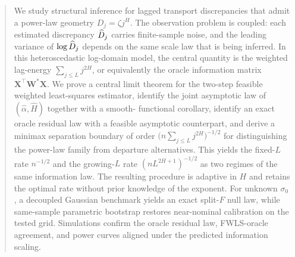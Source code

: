 \begin{abstract}
We study structural inference for lagged transport discrepancies that admit a
power-law geometry $D_j = \zeta j^H$. The observation problem is coupled:
each estimated discrepancy $\Dhj$ carries finite-sample noise, and the leading
variance of $\log \Dhj$ depends on the same scale law that is being inferred.
In this heteroscedastic log-domain model, the central quantity is the weighted
lag-energy $\sum_{j \leq L} j^{2H}$, or equivalently the oracle information
matrix $\mathbf X^\top \mathbf W^* \mathbf X$. We prove a central limit
theorem for the two-step feasible weighted least-squares estimator, identify the
joint asymptotic law of $(\hat\alpha,\widehat H)$ together with a smooth-
functional corollary, identify an exact oracle residual law with a feasible
asymptotic counterpart, and derive a minimax separation boundary of order
$\bigl(n\sum_{j \leq L} j^{2H}\bigr)^{-1/2}$ for distinguishing the power-law
family from departure alternatives. This yields the fixed-$L$ rate
$n^{-1/2}$ and the growing-$L$ rate $(nL^{2H+1})^{-1/2}$ as two regimes of the
same information law. The resulting procedure is adaptive in $H$ and retains
the optimal rate without prior knowledge of the exponent. For unknown
$\sigma_0$, a decoupled Gaussian benchmark yields an exact split-$F$ null law,
while same-sample parametric bootstrap restores near-nominal calibration on the
tested grid. Simulations confirm the oracle residual law, FWLS-oracle agreement,
and power curves aligned under the predicted information scaling.
\end{abstract}
